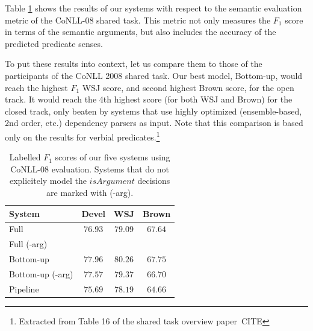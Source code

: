 
Table \ref{tbl:results} shows the results of our systems with respect to the semantic evaluation metric of the CoNLL-08 shared task. This metric not only measures the $F_1$ score in terms of the semantic arguments, but also includes the accuracy of the predicted predicate senses. %

To put these results into context, let us compare them to those of the participants of the CoNLL 2008 shared task. Our best model, Bottom-up, would reach the highest $F_1$ WSJ score, and second highest Brown score, for the open track. It would reach the 4th highest score (for both WSJ and Brown) for the closed track, only beaten by systems that use highly optimized (ensemble-based, 2nd order, etc.) dependency parsers as input. Note that this comparison is based only on the results for verbial predicates.\footnote{Extracted from Table 16 of the shared task overview paper~CITE}

\begin{table}[ht]
    \centering
    \begin{tabular}{|p{3.0cm}|c|c|c|}\hline
        System                    & Devel      & WSJ       & Brown \\\hline 
        Full                      & $76.93$  & $79.09$ & $67.64$ \\
        Full (-arg)               &          &         &         \\
        Bottom-up                 & $77.96$  & $80.26$ & $67.75$ \\
        Bottom-up (-arg)          & $77.57$  & $79.37$ & $66.70$ \\
        Pipeline                  & $75.69$  & $78.19$ & $64.66$ \\
        \hline
    \end{tabular}
    \caption{Labelled $F_1$ scores of our five systems using CoNLL-08
    evaluation. Systems that do not explicitely model the $isArgument$ decisions are marked with (-arg).}
    \label{tbl:results}
\end{table}

